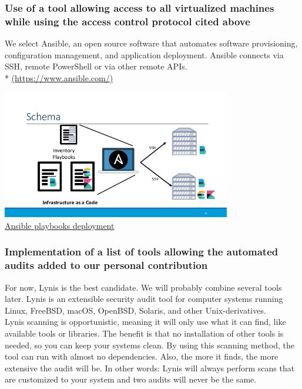 \vspace{-1.3cm}
\subsubsection{Use of a tool allowing access to all virtualized machines while using the access control protocol cited above}
\vspace{0.5cm}

We select Ansible, an open source software that automates software
provisioning, configuration management, and application deployment.
Ansible connects via SSH, remote PowerShell or via other remote APIs.\\ *
\url{(https://www.ansible.com/)}

\begin{center}

\includegraphics[width=0.75\textwidth]{images/ansible-example.jpg}
\\
\underline{Ansible playbooks deployment}

\end{center}

\pagebreak

\subsubsection{Implementation of a list of tools allowing the automated audits added to our
  personal contribution}

\vspace{0.3cm}
For now, Lynis is the best candidate. We will probably combine several tools later.
Lynis is an extensible security audit tool for computer systems
running Linux, FreeBSD, macOS, OpenBSD, Solaris, and other
Unix-derivatives.
\\ 

Lynis scanning is opportunistic, meaning it will only use what it can find, like available tools or libraries. The benefit is that no installation of other tools is needed, so you can keep your systems clean.
By using this scanning method, the tool can run with almost no dependencies. Also, the more it finds, the more extensive the audit will be. In other words: Lynis will always perform scans that are customized to your system and two audits will never be the same.
\\

